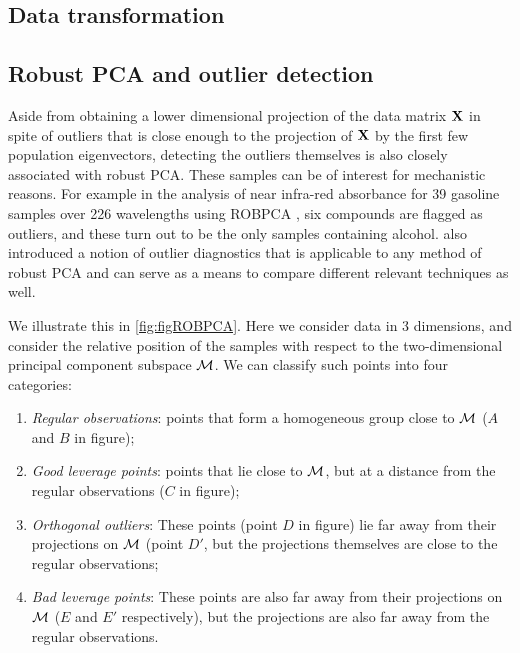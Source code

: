 \subsection{Data transformation}

\subsection{Robust PCA and outlier detection}
Aside from obtaining a lower dimensional projection of the data matrix ${\mathbf{X}}$ in spite of outliers that is close enough to the projection of ${\mathbf{X}}$ by the first few population eigenvectors, detecting the outliers themselves is also closely associated with robust PCA. These samples can be of interest for mechanistic reasons. For example in the analysis of near infra-red absorbance for 39 gasoline samples over 226 wavelengths using ROBPCA \citep{hubert05}, six compounds are flagged as outliers, and these turn out to be the only samples containing alcohol. \cite{hubert05} also introduced a notion of outlier diagnostics that is applicable to any method of robust PCA and can serve as a means to compare different relevant techniques as well.

We illustrate this in \ref{fig:figROBPCA}. Here we consider data in 3 dimensions, and consider the relative position of the samples with respect to the two-dimensional principal component subspace ${\cal{M}}$. We can classify such points into four categories:

\begin{enumerate}
\item{\it Regular observations}: points that form a homogeneous group close to ${\cal{M}}$ ($A$ and $B$ in figure);
\item{\it Good leverage points}: points that lie close to ${\cal{M}}$, but at a distance from the regular observations ($C$ in figure);
\item{\it Orthogonal outliers}: These points (point $D$ in figure) lie far away from their projections on ${\cal{M}}$ (point $D'$, but the projections themselves are close to the regular observations;
\item{\it Bad leverage points}: These points are also far away from their projections on ${\cal{M}}$ ($E$ and $E'$ respectively), but the projections are also far away from the regular observations.
\end{enumerate}

